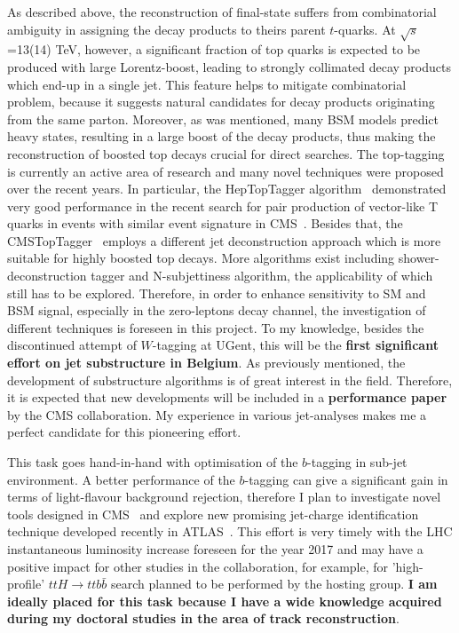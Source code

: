 As described above, the reconstruction of \fourtop final-state suffers from combinatorial ambiguity in assigning the decay products to theirs parent $t$-quarks. At $\sqrt{s}$=13(14) TeV, however, a significant fraction of top quarks is expected to be produced with large Lorentz-boost, leading to strongly collimated decay products which end-up in a single jet. This feature helps to mitigate combinatorial problem, because it suggests natural candidates for decay products originating from the same parton. Moreover, as was mentioned, many BSM models predict heavy states, resulting in a large boost of the decay products, thus making the reconstruction of boosted top decays crucial for direct searches. The top-tagging is currently an active area of research and many novel techniques were proposed over the recent years. In particular, the HepTopTagger algorithm~\cite{heptoptagger} demonstrated very good performance in the recent search for pair production of vector-like T quarks in events with similar event signature in CMS~\cite{Khachatryan:2015oba}. Besides that, the CMSTopTagger~\cite{Kaplan:2008ie} employs a different jet deconstruction approach which is more suitable for highly boosted top decays. More algorithms exist including shower-deconstruction tagger and N-subjettiness algorithm, the applicability of which~\cite{CMS:2014fya} still has to be explored. Therefore, in order to enhance sensitivity to SM and BSM \fourtop signal, especially in the zero-leptons decay channel, the investigation of different techniques is foreseen in this project. To my knowledge, besides the discontinued attempt of $W$-tagging at UGent, this will be the \textbf{first significant effort on jet substructure in Belgium}. As previously mentioned, the development of substructure algorithms is of great interest in the field. Therefore, it is expected that new developments will be included in a \textbf{performance paper} by the CMS collaboration.
My experience in various jet-analyses makes me a perfect candidate for this pioneering effort.

This task goes hand-in-hand with optimisation of the $b$-tagging in sub-jet environment. A better performance of the $b$-tagging can give a significant gain in terms of light-flavour background rejection, therefore I plan to investigate novel tools designed in CMS~\cite{Bertolini:2014bba} and explore new promising jet-charge identification technique developed recently in ATLAS~\cite{Aad:2015cua,ATLAS:2015jetcharge}. This effort is very timely with the LHC instantaneous luminosity increase foreseen for the year 2017 and may have a positive impact for other studies in the collaboration, for example, for 'high-profile' $ttH \rightarrow ttb\bar{b}$ search planned to be performed by the hosting group. \textbf{I am ideally placed for this task because I have a wide knowledge acquired during my doctoral studies in the area of track reconstruction}.

